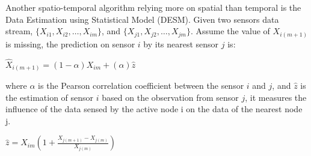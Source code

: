 
Another spatio-temporal algorithm relying more on spatial than temporal is the Data Estimation using Statistical Model (DESM)\cite{li2008data}.  
Given two sensors data stream, $\{X_{i1},X_{i2},\dots,X_{im}\}$, and $\{X_{j1},X_{j2},\dots,X_{jm}\}$. 
Assume the value of $X_{i(m+1)}$ is missing,
the prediction on sensor $i$ by its nearest sensor $j$ is:

$\hat{X}_{i(m+1)} = (1-\alpha)X_{im} + (\alpha)\hat{z}$

where $\alpha$ is the Pearson correlation coefficient between the sensor $i$ and $j$, and $\hat{z}$ is the estimation of sensor $i$ based on the observation from sensor $j$, it measures the influence of the data sensed by the active node i on the data of the nearest node j. 

$\hat{z} = X_{im}(1+\frac{X_{j(m+1)}-X_{j(m)}}{X_{j(m)}})$


